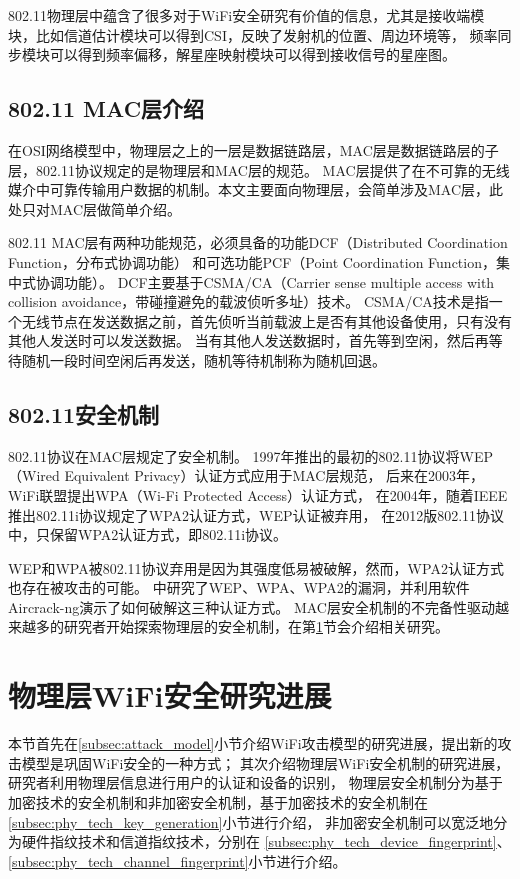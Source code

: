 		802.11物理层中蕴含了很多对于WiFi安全研究有价值的信息，尤其是接收端模块，比如信道估计模块可以得到CSI，反映了发射机的位置、周边环境等，
		频率同步模块可以得到频率偏移，解星座映射模块可以得到接收信号的星座图。

		\subsection{802.11 MAC层介绍}
		在OSI网络模型中，物理层之上的一层是数据链路层，MAC层是数据链路层的子层，802.11协议规定的是物理层和MAC层的规范。
		MAC层提供了在不可靠的无线媒介中可靠传输用户数据的机制。本文主要面向物理层，会简单涉及MAC层，此处只对MAC层做简单介绍。

		802.11 MAC层有两种功能规范，必须具备的功能DCF（Distributed Coordination Function，分布式协调功能）
		和可选功能PCF（Point Coordination Function，集中式协调功能）。
		DCF主要基于CSMA/CA（Carrier sense multiple access with collision avoidance，带碰撞避免的载波侦听多址）技术。
		CSMA/CA技术是指一个无线节点在发送数据之前，首先侦听当前载波上是否有其他设备使用，只有没有其他人发送时可以发送数据。
		当有其他人发送数据时，首先等到空闲，然后再等待随机一段时间空闲后再发送，随机等待机制称为随机回退\cite{citsa05backoff}。

		\subsection{802.11安全机制}\label{subsec:80211security}
		802.11协议在MAC层规定了安全机制。
		1997年推出的最初的802.11协议将WEP（Wired Equivalent Privacy）认证方式应用于MAC层规范，
		后来在2003年，WiFi联盟提出WPA（Wi-Fi Protected Access）认证方式，
		在2004年，随着IEEE推出802.11i协议规定了WPA2认证方式，WEP认证被弃用\cite{wikiwep}，
		在2012版802.11协议中，只保留WPA2认证方式，即802.11i协议\cite{ieee80211}。

		WEP和WPA被802.11协议弃用是因为其强度低易被破解，然而，WPA2认证方式也存在被攻击的可能。
		\cite{ijarcet12wpa2}中研究了WEP、WPA、WPA2的漏洞，并利用软件Aircrack-ng演示了如何破解这三种认证方式。
		MAC层安全机制的不完备性驱动越来越多的研究者开始探索物理层的安全机制，在第\ref{sec:security_research}节会介绍相关研究。

	\section{物理层WiFi安全研究进展}\label{sec:security_research}
	本节首先在\ref{subsec:attack_model}小节介绍WiFi攻击模型的研究进展，提出新的攻击模型是巩固WiFi安全的一种方式；
	其次介绍物理层WiFi安全机制的研究进展，研究者利用物理层信息进行用户的认证和设备的识别，
	物理层安全机制分为基于加密技术的安全机制和非加密安全机制，基于加密技术的安全机制在\ref{subsec:phy_tech_key_generation}小节进行介绍，
	非加密安全机制可以宽泛地分为硬件指纹技术和信道指纹技术\cite{ieeewc10noncryp}\cite{mobicom08radiometric}，分别在
	\ref{subsec:phy_tech_device_fingerprint}、\ref{subsec:phy_tech_channel_fingerprint}小节进行介绍。
